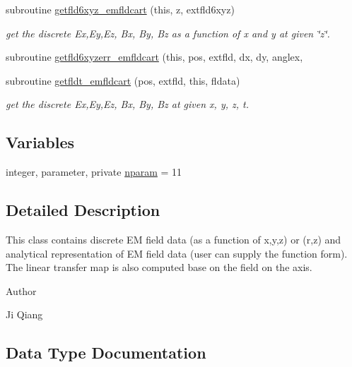 \begin{DoxyCompactItemize}
\item 
subroutine \mbox{\hyperlink{namespaceemfldcartclass_a524c612ff816f308845b0171733a95a5}{getfld6xyz\+\_\+emfldcart}} (this, z, extfld6xyz)
\begin{DoxyCompactList}\small\item\em get the discrete Ex,Ey,Ez, Bx, By, Bz as a function of x and y at given \char`\"{}z\char`\"{}. \end{DoxyCompactList}\item 
subroutine \mbox{\hyperlink{namespaceemfldcartclass_af92b0973e83fa817606951d4155f51b9}{getfld6xyzerr\+\_\+emfldcart}} (this, pos, extfld, dx, dy, anglex,
\item 
subroutine \mbox{\hyperlink{namespaceemfldcartclass_a63a14e90f4526aa45d3d28a9611d3908}{getfldt\+\_\+emfldcart}} (pos, extfld, this, fldata)
\begin{DoxyCompactList}\small\item\em get the discrete Ex,Ey,Ez, Bx, By, Bz at given x, y, z, t. \end{DoxyCompactList}\end{DoxyCompactItemize}
\subsection*{Variables}
\begin{DoxyCompactItemize}
\item 
integer, parameter, private \mbox{\hyperlink{namespaceemfldcartclass_a72ee7da1adbf56a707b72607da000549}{nparam}} = 11
\end{DoxyCompactItemize}


\subsection{Detailed Description}
This class contains discrete EM field data (as a function of x,y,z) or (r,z) and analytical representation of EM field data (user can supply the function form). The linear transfer map is also computed base on the field on the axis. 

\begin{DoxyAuthor}{Author}

\end{DoxyAuthor}
Ji Qiang 

\subsection{Data Type Documentation}
\label{structemfldcartclass_1_1emfldcart}

